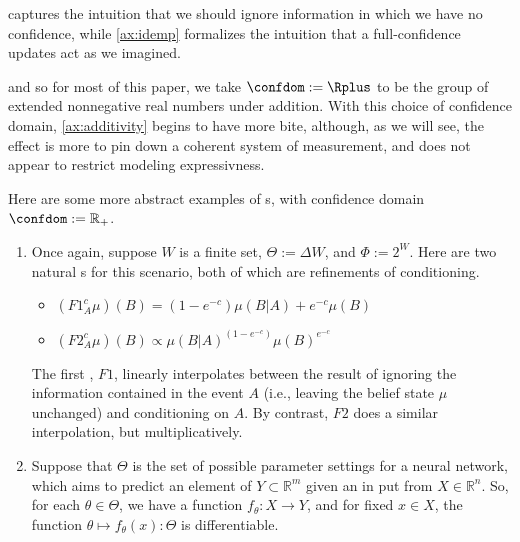  captures the intuition that we should ignore information in which we have no confidence, while \cref{ax:idemp} formalizes the intuition that a full-confidence updates act as we imagined.








\begin{phaseout}
and so for most of this paper, we take $\confdom := \Rplus$ to be the group of extended nonnegative real numbers under addition.
With this choice of confidence domain, \cref{ax:additivity} begins to have more bite, although, as we will see, the effect is more to pin down a coherent system of measurement, and does not appear to restrict modeling expressivness.
%
%


Here are some more abstract examples of \cofunc s, with confidence domain
$\confdom := \mathbb R_+$.
\begin{enumerate}
\item
Once again, suppose $W$ is a finite set,
$\Theta := \Delta W$, and $\Phi := 2^W$.
Here are two natural \cofunc s for this scenario, both of which are refinements of conditioning.
\begin{itemize}
	\item
	$\displaystyle
		(F1^c_A \mu)(B) = (1-e^{-c}) \mu(B|A) +  e^{-c} \mu(B)
	$
	\item
	$\displaystyle
		(F2^c_A \mu)(B) \propto \mu(B|A)^{(1-e^{-c})} \mu(B)^{e^{-c}}
	$
\end{itemize}
The first \cofunc, $F1$, linearly interpolates between the result of ignoring the information contained in the event $A$ (i.e., leaving the belief state $\mu$ unchanged) and conditioning on $A$.
By contrast, $F2$ does a similar interpolation, but multiplicatively.

\item
Suppose that $\Theta$ is the set of possible parameter settings for a neural network, which aims to predict an element of $Y \subset \mathbb R^{m}$ given an in put from $X \in \mathbb R^{n}$.
So, for each $\theta \in \Theta$, we have a function $f_\theta : X \to Y$, and for fixed $x \in X$, the function $\theta \mapsto f_\theta(x) : \Theta$ is differentiable.


\end{enumerate}
\end{phaseout}
